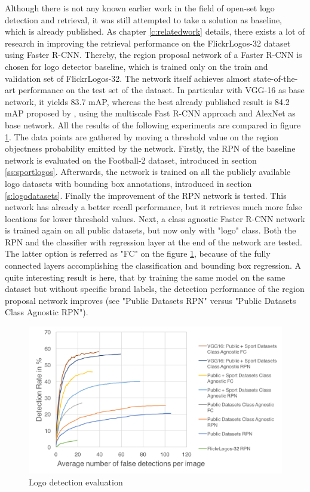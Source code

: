 Although there is not any known earlier work in the field of open-set logo detection and retrieval, it was still attempted to take a solution as baseline, which is already published. As chapter \ref{c:relatedwork} details, there exists a lot of research in improving the retrieval performance on the FlickrLogos-32 dataset using Faster R-CNN. Thereby, the region proposal network of a Faster R-CNN is chosen for logo detector baseline, which is trained only on the train and validation set of FlickrLogos-32. The network itself achieves almost state-of-the-art performance on the test set of the dataset. In particular with VGG-16 as base network, it yields 83.7 mAP, whereas the best already published result is 84.2 mAP proposed by \cite{Bao:2016:RCL:3007669.3007728}, using the multiscale Fast R-CNN approach and AlexNet as base network.
\bigbreak
All the results of the following experiments are compared in figure \ref{f:detectioneval}. The data points are gathered by moving a threshold value on the region objectness probability emitted by the network.
Firstly, the RPN of the baseline network is evaluated on the Football-2 dataset, introduced in section \ref{ss:sportlogos}. Afterwards, the network is trained on all the publicly available logo datasets with bounding box annotations, introduced in section \ref{s:logodatasets}. Finally the improvement of the RPN network is tested. This network has already a better recall performance, but it retrieves much more false locations for lower threshold values.
Next, a class agnostic Faster R-CNN network is trained again on all public datasets, but now only with "logo" class. Both the RPN and the classifier with regression layer at the end of the network are tested. The latter option is referred as "FC" on the figure \ref{f:detectioneval}, because of the fully connected layers accomplishing the classification and bounding box regression. A quite interesting result is here, that by training the same model on the same dataset but without specific brand labels, the detection performance of the region proposal network improves (see "Public Datasets RPN" versus "Public Datasets Class Agnostic RPN").

\begin{figure}
  \centering
  \includegraphics[width=120mm]{images/mt/logodetection.png}
  \caption{Logo detection evaluation}
  \label{f:detectioneval}
\end{figure}

